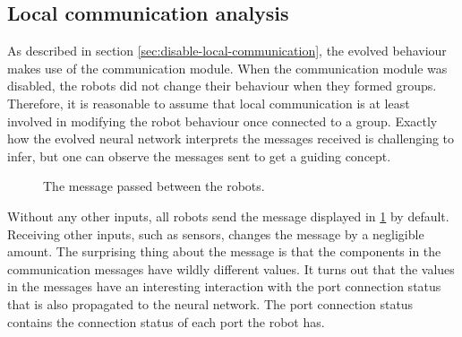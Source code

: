 \subsection{Local communication analysis}
As described in section \ref{sec:disable-local-communication}, the evolved behaviour makes use of the communication module.
When the communication module was disabled, the robots did not change their behaviour when they formed groups.
Therefore, it is reasonable to assume that local communication is at least involved in modifying the robot behaviour once connected to a group.
Exactly how the evolved neural network interprets the messages received is challenging to infer, but one can observe the messages sent to get a guiding concept.

\begin{figure}[H]
	\centering
	[0.992 0.999 0.423 0.002]
	
	\caption{The message passed between the robots.}    
	\label{fig:message_default}
\end{figure}

Without any other inputs, all robots send the message displayed in \ref{fig:message_default} by default.
Receiving other inputs, such as sensors, changes the message by a negligible amount.
The surprising thing about the message is that the components in the communication messages have wildly different values.
It turns out that the values in the messages have an interesting interaction with the port connection status that is also propagated to the neural network.
The port connection status contains the connection status of each port the robot has.

